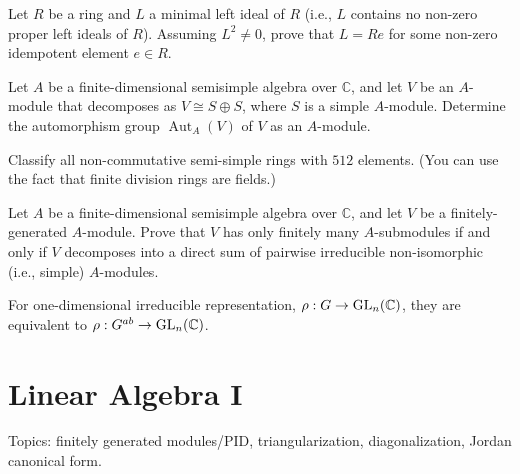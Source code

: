 \begin{prob}[S2005-Q4]
    Let \( R \) be a ring and \( L \) a minimal left ideal of \( R \) (i.e., \( L \) contains no non-zero proper left ideals of \( R \)). Assuming \( L^2 \neq 0 \), prove that \( L = Re \) for some non-zero idempotent element \( e \in R \).
\end{prob}

\begin{prob}[S2016-Q6, F2006-Q6, F2008-Q6]
    Let \( A \) be a finite-dimensional semisimple algebra over \( \mathbb{C} \), and let \( V \) be an \( A \)-module that decomposes as \( V \cong S \oplus S \), where \( S \) is a simple \( A \)-module. Determine the automorphism group \( \operatorname{Aut}_A(V) \) of \( V \) as an \( A \)-module.
\end{prob}



\begin{prob}[S2010-Q5]
    Classify all non-commutative semi-simple rings with $512$ elements.
(You can use the fact that finite division rings are fields.)
\end{prob}

\begin{prob}[F2011-Q5]
    Let \( A \) be a finite-dimensional semisimple algebra over \( \mathbb{C} \), and let \( V \) be a finitely-generated \( A \)-module. Prove that \( V \) has only finitely many \( A \)-submodules if and only if \( V \) decomposes into a direct sum of pairwise irreducible non-isomorphic (i.e., simple)  \( A \)-modules.
\end{prob}

\begin{warn}
    For one-dimensional irreducible representation, $\rho: G\to \text{GL}_n(\mathbb{C})$, they are equivalent to $\rho: G^{ab}\to\text{GL}_n(\mathbb{C})$.
\end{warn}




















\chapter{Linear Algebra I}
Topics: finitely generated modules/PID, triangularization, diagonalization, Jordan canonical form.

